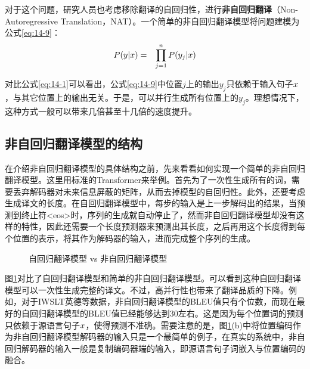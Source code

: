 \parinterval 对于这个问题，研究人员也考虑移除翻译的自回归性，进行{\small\sffamily\bfseries{非自回归翻译}}（Non-Autoregressive Translation，NAT）。一个简单的非自回归翻译模型将问题建模为公式\eqref{eq:14-9}：
\begin{eqnarray}
{P}({y}|{x}) &=& \prod_{j=1}^n {{P}(y_j|{x})}
\label{eq:14-9}
\end{eqnarray}

\parinterval 对比公式\eqref{eq:14-1}可以看出，公式\eqref{eq:14-9}中位置$j$上的输出$y_j$只依赖于输入句子${x}$，与其它位置上的输出无关。于是，可以并行生成所有位置上的${y_j}$。理想情况下，这种方式一般可以带来几倍甚至十几倍的速度提升。


\subsection{非自回归翻译模型的结构}

\parinterval 在介绍非自回归翻译模型的具体结构之前，先来看看如何实现一个简单的非自回归翻译模型。这里用标准的Transformer来举例。首先为了一次性生成所有的词，需要丢弃解码器对未来信息屏蔽的矩阵，从而去掉模型的自回归性。此外，还要考虑生成译文的长度。在自回归翻译模型中，每步的输入是上一步解码出的结果，当预测到终止符<eos>时，序列的生成就自动停止了，然而非自回归翻译模型却没有这样的特性，因此还需要一个长度预测器来预测出其长度，之后再用这个长度得到每个位置的表示，将其作为解码器的输入，进而完成整个序列的生成。

\begin{figure}[htp]
\centering
 
\caption{自回归翻译模型 vs 非自回归翻译模型}
\label{fig:14-12}
\end{figure}

\parinterval 图\ref{fig:14-12}对比了自回归翻译模型和简单的非自回归翻译模型。可以看到这种自回归翻译模型可以一次性生成完整的译文。不过，高并行性也带来了翻译品质的下降。例如，对于IWSLT英德等数据，非自回归翻译模型的BLEU值只有个位数，而现在最好的自回归翻译模型的BLEU值已经能够达到30左右。这是因为每个位置词的预测只依赖于源语言句子${x}$，使得预测不准确。需要注意的是，图\ref{fig:14-12}(b)中将位置编码作为非自回归翻译模型解码器的输入只是一个最简单的例子，在真实的系统中，非自回归解码器的输入一般是复制编码器端的输入，即源语言句子词嵌入与位置编码的融合。


